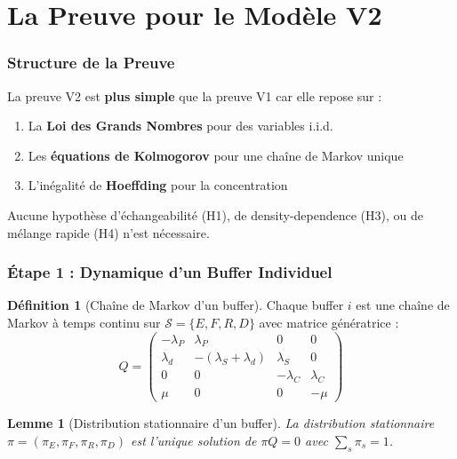 \documentclass[11pt,a4paper]{article}
\theoremstyle{plain}
\newtheorem{lemma}[theorem]{Lemme}
\theoremstyle{definition}
\newtheorem{definition}[theorem]{Définition}
\theoremstyle{remark}
\newcommand{\calS}{\mathcal{S}}
\begin{document}
\part{La Preuve pour le Modèle V2}

\section{Structure de la Preuve}

La preuve V2 est \textbf{plus simple} que la preuve V1 car elle repose sur :
\begin{enumerate}
    \item La \textbf{Loi des Grands Nombres} pour des variables i.i.d.
    \item Les \textbf{équations de Kolmogorov} pour une chaîne de Markov unique
    \item L'inégalité de \textbf{Hoeffding} pour la concentration
\end{enumerate}

Aucune hypothèse d'échangeabilité (H1), de density-dependence (H3), ou de mélange rapide (H4) n'est nécessaire.

\section{Étape 1 : Dynamique d'un Buffer Individuel}

\begin{definition}[Chaîne de Markov d'un buffer]
Chaque buffer $i$ est une chaîne de Markov à temps continu sur $\calS = \{E, F, R, D\}$ avec matrice génératrice :
\[
Q = \begin{pmatrix}
-\lambda_P & \lambda_P & 0 & 0 \\
\lambda_d & -(\lambda_S + \lambda_d) & \lambda_S & 0 \\
0 & 0 & -\lambda_C & \lambda_C \\
\mu & 0 & 0 & -\mu
\end{pmatrix}
\]
\end{definition}

\begin{lemma}[Distribution stationnaire d'un buffer]
La distribution stationnaire $\pi = (\pi_E, \pi_F, \pi_R, \pi_D)$ est l'unique solution de $\pi Q = 0$ avec $\sum_s \pi_s = 1$.
\end{lemma}
\end{document}
